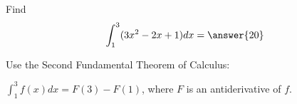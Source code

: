 \documentclass{ximera}
\author{Gregory Hartman \and Matthew Carr}
\begin{document}
\begin{exercise}

Find
\[
\int_{1}^{3}(3x^2-2x+1) dx=\answer{20}
\]
\begin{hint}
Use the Second Fundamental Theorem of Calculus: 

$\int_{1}^{3}f(x) dx=F(3)-F(1)$, where $F$ is an antiderivative of $f$.
\end{hint}
\end{exercise}
\end{document}
